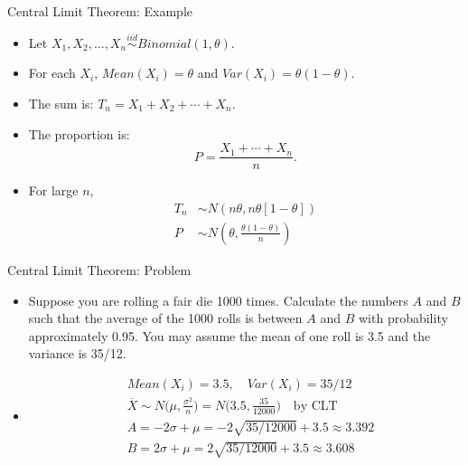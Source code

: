 \documentclass[10pt, handout, xcolor=table]{beamer}
\begin{document}
\begin{frame}{Central Limit Theorem: Example}
\begin{itemize}
\setlength{\itemsep}{15pt}
\item<1-> Let $X_1, X_2,\dots, X_n \stackrel{iid}{\sim} Binomial(1, \theta)$.
\item<2-> For each $X_i$, $Mean(X_i) = \theta$ and $Var(X_i) = \theta(1-\theta).$
\item<3-> The sum is: $T_n = X_1 + X_2 + \cdots + X_n$.
\item<4-> The proportion is:
 $$P = \frac{X_1 + \cdots + X_n}{n}.$$
\item<6-> For large $n$, 
\begin{align*}
T_n &\sim N\left(n\theta, n\theta[1-\theta]\right) \\[1.5 em]
P &\sim N\left( \theta, \frac{\theta(1-\theta)}{n}\right)
\end{align*}
\end{itemize}
\end{frame}

\begin{frame}{Central Limit Theorem: Problem}
\begin{itemize}
\item<1-> Suppose you are rolling a fair die 1000 times. Calculate the numbers $A$ and $B$ such that the average of the 1000 rolls is between $A$ and $B$ with probability approximately 0.95. You may assume the mean of one roll is 3.5 and the variance is 35/12.
\item<2->[] {\color{red}
\vspace*{-0.5cm}
\begin{align*}
&Mean(X_i) = 3.5, \quad Var(X_i) = 35/12 \\
&\overline{X} \sim N\bigg(\mu, \frac{\sigma^2}{n}\bigg) = N\bigg(3.5, \frac{35}{12000} \bigg) \quad \text{by CLT}\\
&A = -2\sigma + \mu = -2\sqrt{35/12000} + 3.5 \approx 3.392 \\
&B = 2\sigma + \mu = 2\sqrt{35/12000} + 3.5 \approx 3.608
\end{align*}}
\vspace*{-0.25cm}
\end{itemize}
\end{frame}
\end{document}
